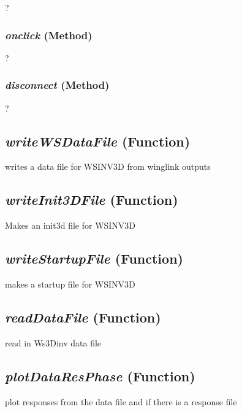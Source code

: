 ?

\subsubsection{\textit{onclick} (Method)}
\label{sssec:modeling.ws3dtools.ListPeriods.onclick}

?

\subsubsection{\textit{disconnect} (Method)}
\label{sssec:modeling.ws3dtools.ListPeriods.disconnect}

?


\subsection{\textit{writeWSDataFile} (Function)}
\label{ssec:modeling.ws3dtools.writeWSDataFile}

writes a data file for WSINV3D from winglink outputs

\subsection{\textit{writeInit3DFile} (Function)}
\label{ssec:modeling.ws3dtools.writeInit3DFile}

Makes an init3d file for WSINV3D

\subsection{\textit{writeStartupFile} (Function)}
\label{ssec:modeling.ws3dtools.writeStartupFile}

makes a startup file for WSINV3D

\subsection{\textit{readDataFile} (Function)}
\label{ssec:modeling.ws3dtools.readDataFile}

read in Ws3Dinv data file


\subsection{\textit{plotDataResPhase} (Function)}
\label{ssec:modeling.ws3dtools.plotDataResPhase}

plot responses from the data file and if there is a response file

